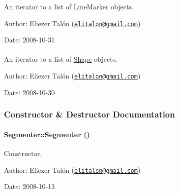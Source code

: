An iterator to a list of LineMarker objects. 

\begin{Desc}
\item[Author:]Eliezer Talón (\href{mailto:elitalon@gmail.com}{\tt elitalon@gmail.com}) \end{Desc}
\begin{Desc}
\item[Date:]2008-10-31 \end{Desc}
\hypertarget{class_segmenter_1190be7ec081a96ee2ae91e0bb256a0d}{
\paragraph[{ShapeIterator}]{}\hfill}
\label{class_segmenter_1190be7ec081a96ee2ae91e0bb256a0d}


An iterator to a list of \hyperlink{class_shape}{Shape} objects. 

\begin{Desc}
\item[Author:]Eliezer Talón (\href{mailto:elitalon@gmail.com}{\tt elitalon@gmail.com}) \end{Desc}
\begin{Desc}
\item[Date:]2008-10-30 \end{Desc}


\subsubsection{Constructor \& Destructor Documentation}
\hypertarget{class_segmenter_d39ec3bda31be180820aa0bdca7b125d}{
\paragraph[{Segmenter}]{\setlength{\rightskip}{0pt plus 5cm}Segmenter::Segmenter ()}\hfill}
\label{class_segmenter_d39ec3bda31be180820aa0bdca7b125d}


Constructor. 

\begin{Desc}
\item[Author:]Eliezer Talón (\href{mailto:elitalon@gmail.com}{\tt elitalon@gmail.com}) \end{Desc}
\begin{Desc}
\item[Date:]2008-10-13 \end{Desc}


